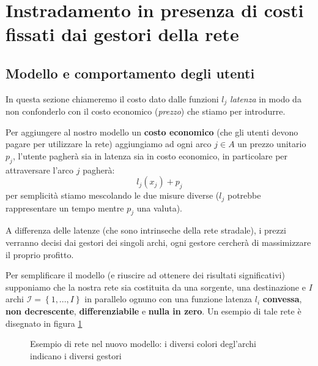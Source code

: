 \documentclass[a4paper]{article}
\theoremstyle{plain}
\theoremstyle{definition}
\theoremstyle{remark}
\newcommand{\set}[1]{\left\{#1\right\}}
\newcommand{\pa}[1]{\left(#1\right)}
\begin{document}
\section{Instradamento in presenza di costi fissati dai gestori della rete}

\subsection{Modello e comportamento degli utenti}
\label{sec:prezzi-modello}

In questa sezione chiameremo il costo dato dalle funzioni $l_j$
\textit{latenza} in modo da non confonderlo con il costo economico
(\textit{prezzo}) che stiamo per introdurre.

Per aggiungere al nostro modello un \textbf{costo economico} (che gli
utenti devono pagare per utilizzare la rete) aggiungiamo ad ogni arco
$j\in A$ un prezzo unitario $p_j$, l'utente pagherà sia in latenza sia
in costo economico, in particolare per attraversare l'arco $j$
pagherà:
\[ l_j\pa{x_j} + p_j \]
per semplicità stiamo mescolando le due misure diverse ($l_j$ potrebbe
rappresentare un tempo mentre $p_j$ una valuta).

A differenza delle latenze (che sono intrinseche della rete stradale),
i prezzi verranno decisi dai gestori dei singoli archi, ogni gestore
cercherà di massimizzare il proprio profitto.

Per semplificare il modello (e riuscire ad ottenere dei risultati
significativi) supponiamo che la nostra rete sia costituita da una
sorgente, una destinazione e $I$ archi $\mathcal{I} = \set{1,...,I}$
in parallelo ognuno con una funzione latenza $l_i$ \textbf{convessa},
\textbf{non decrescente}, \textbf{differenziabile} e \textbf{nulla in
  zero}. Un esempio di tale rete è disegnato in figura
\ref{fig:provider}

\begin{figure}[ht]
  \centering
  \caption{Esempio di rete nel nuovo modello: i diversi colori
    degl'archi indicano i diversi gestori}
  \label{fig:provider}
\end{figure}
\end{document}
